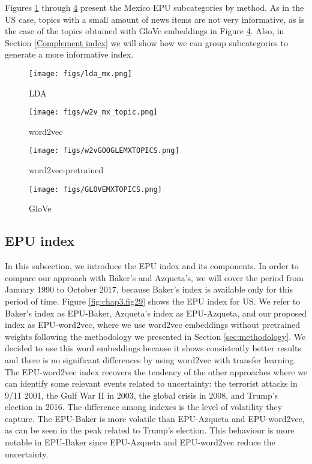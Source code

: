 \documentclass{article}
\begin{document}
Figures \ref{fig:chap3.fig26} through \ref{fig:chap3.fig28}  present the Mexico EPU subcategories by method. As in the US case, topics with a small amount of news items are not very informative, as is the case of the topics obtained with GloVe embeddings in Figure \ref{fig:chap3.fig28}. Also, in Section \ref{Complement index} we will show how we can group subcategories to generate a more informative index. 

\begin{figure}[H]
  \centering
  \texttt{[image: figs/lda\_mx.png]}
\caption{LDA}  
  \label{fig:chap3.fig26}
\end{figure}

\begin{figure}[H]
  \centering
  \texttt{[image: figs/w2v\_mx\_topic.png]}
\caption{word2vec}
\label{fig:chap3.fig26-2}
\end{figure}

\begin{figure}[H]
  \centering
  \texttt{[image: figs/w2vGOOGLEMXTOPICS.png]}
\caption{word2vec-pretrained}
  \label{fig:chap3.fig27}
\end{figure}

\begin{figure}[H]
  \centering
  \texttt{[image: figs/GLOVEMXTOPICS.png]}
\caption{GloVe}
\label{fig:chap3.fig28}
\end{figure}


\subsection{EPU index} 

In this subsection, we introduce the EPU index and its components. In order to compare our approach with Baker's and Azqueta's, we will cover the period from January 1990 to October  2017, because Baker's index is available only for this period of time. Figure \ref{fig:chap3.fig29} shows the EPU index for US. We refer to Baker's index as EPU-Baker, Azqueta's index as EPU-Azqueta, and our proposed index as EPU-word2vec, where we use word2vec embeddings without pretrained weights following the methodology we presented in Section \ref{sec:methodology}. We decided to use this word embeddings because it shows consistently better results and there is no significant differences by using word2vec with transfer learning. The  EPU-word2vec index recovers the tendency of the other approaches where we can identify some relevant events related to uncertainty: the terrorist attacks in 9/11 2001, the Gulf War II in 2003, the global crisis in 2008, and Trump's election in 2016. The difference among indexes is the level of volatility they capture. The EPU-Baker is more volatile than  EPU-Azqueta and EPU-word2vec, as can be seen in the peak related to Trump's election. This behaviour is more notable in EPU-Baker since  EPU-Azqueta and EPU-word2vec reduce the uncertainty.
\end{document}
